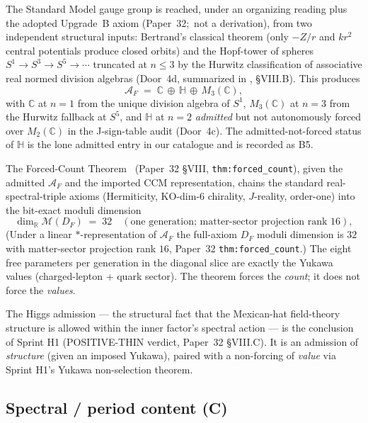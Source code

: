 \documentclass[11pt,a4paper]{article}
\theoremstyle{plain}
\theoremstyle{definition}
\newcommand{\Mcal}{\mathcal{M}}
\newcommand{\AF}{\mathcal{A}_F}
\newcommand{\DF}{D_F}
\newcommand{\sphere}[1]{S^{#1}}
\newcommand{\R}{\mathbb{R}}
\newcommand{\C}{\mathbb{C}}
\newcommand{\HH}{\mathbb{H}}
\begin{document}
The Standard Model gauge group is reached, under an organizing reading plus the adopted Upgrade~B axiom (Paper~32;\ not a derivation), from two independent structural inputs:  Bertrand's classical theorem (only $-Z/r$ and $kr^2$ central potentials produce closed orbits) and the Hopf-tower of spheres $\sphere{1} \to \sphere{3} \to \sphere{5} \to \cdots$ truncated at $n \le 3$ by the Hurwitz classification of associative real normed division algebras (Door~4d, summarized in \cite{paper32}, \S VIII.B). This produces
\begin{equation}
  \AF \;=\; \C \,\oplus\, \HH \,\oplus\, M_3(\C),
  \label{eq:af}
\end{equation}
with $\C$ at $n=1$ from the unique division algebra of $\sphere{1}$, $M_3(\C)$ at $n=3$ from the Hurwitz fallback at $\sphere{5}$, and $\HH$ at $n=2$ \emph{admitted} but not autonomously forced over $M_2(\C)$ in the J-sign-table audit (Door~4c). The admitted-not-forced status of $\HH$ is the lone admitted entry in our catalogue and is recorded as B5.

The Forced-Count Theorem~\cite{paper32} (Paper~32 \S VIII, \texttt{thm:forced\_count}), given the admitted $\mathcal{A}_F$ and the imported CCM representation, chains the standard real-spectral-triple axioms (Hermiticity, KO-dim-6 chirality, $J$-reality, order-one) into the bit-exact moduli dimension
\begin{equation}
  \dim_{\R} \Mcal(\DF) \;=\; 32 \quad (\text{one generation; matter-sector projection rank } 16),
  \label{eq:forced_count}
\end{equation}
(Under a linear $*$-representation of $\mathcal{A}_F$ the full-axiom $D_F$ moduli dimension is $32$ with matter-sector projection rank $16$, Paper~32 \texttt{thm:forced\_count}.) The eight free parameters per generation in the diagonal slice are exactly the Yukawa values (charged-lepton + quark sector). The theorem forces the \emph{count}; it does not force the \emph{values}.

The Higgs admission --- the structural fact that the Mexican-hat field-theory structure is allowed within the inner factor's spectral action --- is the conclusion of Sprint H1 (POSITIVE-THIN verdict, Paper~32 \S VIII.C). It is an admission of \emph{structure} (given an imposed Yukawa), paired with a non-forcing of \emph{value} via Sprint H1's Yukawa non-selection theorem.

\subsection{Spectral / period content (C)}
\label{sec:forced_periods}
\end{document}
